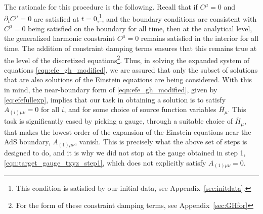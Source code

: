 \documentclass[a4paper,11pt]{article}
\numberwithin{equation}{section}
\begin{document}
The rationale for this procedure is the following.
Recall that if $C^\mu=0$ and $\partial_t C^\mu=0$ are satisfied at $t=0$,\footnote{This condition is satisfied by our initial data, see Appendix~\ref{sec:initdata}.}, and the boundary conditions are consistent with $C^\mu=0$ being satisfied on the boundary for all time, then at the analytical level, the generalized harmonic constraint $C^\mu=0$ remains satisfied in the interior for all time. 
The addition of constraint damping terms ensures that this remains true at the level of the discretized equations\footnote{For the form of these constraint damping terms, see Appendix~\ref{sec:GHfor}}.
Thus, in solving the expanded system of equations \eqref{eqn:efe_gh_modified}, we are assured that only the subset of solutions that are also solutions of the Einstein equations are being considered.
With this in mind, the near-boundary form of \eqref{eqn:efe_gh_modified}, given by \eqref{eq:efefullexp}, implies that our task in obtaining a solution is to satisfy $A_{(i)\mu\nu}=0$ for all $i$, and for some choice of source function variables $\bar{H}_\mu$. 
This task is significantly eased by picking a gauge, through a suitable choice of $\bar{H}_\mu$, that makes the lowest order of the expansion of the Einstein equations near the AdS boundary, $A_{(1)\mu\nu}$, vanish.
This is precisely what the above set of steps is designed to do, and it is why we did not stop at the gauge obtained in step 1, \eqref{eqn:target_gauge_txyz_step1}, which does not explicitly satisfy $A_{(1)\mu\nu}=0$. 
\end{document}
